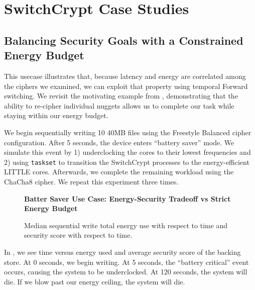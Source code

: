 \section{SwitchCrypt Case Studies}\label{sec:usecases}


\subsection{Balancing Security Goals with a Constrained Energy Budget}

This usecase illustrates that, because latency and energy are correlated among
the ciphers we examined, we can exploit that property using temporal Forward
switching. We revisit the motivating example from ,
demonstrating that the ability to re-cipher individual nuggets allows us to
complete our task while staying within our energy budget.

We begin sequentially writing 10 40MB files using the Freestyle Balanced cipher
configuration. After 5 seconds, the device enters ``battery saver'' mode. We
simulate this event by 1) underclocking the cores to their lowest frequencies
and 2) using \texttt{taskset} to transition the SwitchCrypt processes to the
energy-efficient LITTLE cores. Afterwards, we complete the remaining workload
using the ChaCha8 cipher. We repeat this experiment three times.

\begin{figure}[ht] \textbf{Batter Saver Use Case: Energy-Security Tradeoff vs
   Strict Energy Budget}\par\medskip
   \centering
   {} \caption{Median sequential write total
   energy use with respect to time and security score with respect to time.}
  \label{fig:usecase-battery}
\end{figure}

In , we see time versus energy used and average security
score of the backing store. At 0 seconds, we begin writing. At 5 seconds, the
``battery critical'' event occurs, causing the system to be underclocked. At 120
seconds, the system will die. If we blow past our energy ceiling, the system
will die.

